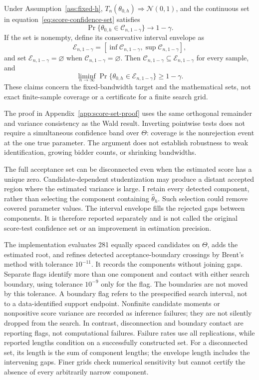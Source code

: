 \begin{proposition}
\label{prop:score-set-coverage}
Under Assumption~\ref{ass:fixed-h},
$T_n(\theta_{0,h})\Rightarrow\mathcal N(0,1)$, and the continuous set in
equation~\eqref{eq:score-confidence-set} satisfies
\[
\Pr\{\theta_{0,h}\in\mathcal C_{n,1-\gamma}\}\longrightarrow1-\gamma.
\]
If the set is nonempty, define its conservative interval envelope as
\begin{equation}
\mathcal E_{n,1-\gamma}
=[\inf\mathcal C_{n,1-\gamma},\sup\mathcal C_{n,1-\gamma}],
\label{eq:score-envelope}
\end{equation}
and set $\mathcal E_{n,1-\gamma}=\varnothing$ when
$\mathcal C_{n,1-\gamma}=\varnothing$. Then
$\mathcal C_{n,1-\gamma}\subseteq\mathcal E_{n,1-\gamma}$ for every sample,
and
\[
\liminf_{n\to\infty}
\Pr\{\theta_{0,h}\in\mathcal E_{n,1-\gamma}\}\geq1-\gamma.
\]
These claims concern the fixed-bandwidth target and the mathematical sets,
not exact finite-sample coverage or a certificate for a finite search grid.
\end{proposition}

The proof in Appendix~\ref{app:score-set-proof} uses the same orthogonal
remainder and variance consistency as the Wald result. Inverting pointwise
tests does not require a simultaneous confidence band over $\Theta$: coverage
is the nonrejection event at the one true parameter. The argument does not
establish robustness to weak identification, growing bidder counts, or
shrinking bandwidths.

The full acceptance set can be disconnected even when the estimated score
has a unique zero. Candidate-dependent studentization may produce a distant
accepted region where the estimated variance is large. I retain every
detected component, rather than selecting the component containing
$\widehat\theta_h$. Such selection could remove covered parameter values.
The interval envelope fills the rejected gaps between components. It is
therefore reported separately and is not called the original score-test
confidence set or an improvement in estimation precision.

The implementation evaluates 281 equally spaced candidates on $\Theta$,
adds the estimated root, and refines detected acceptance-boundary crossings
by Brent's method with tolerance $10^{-11}$. It records the components without
joining gaps. Separate flags identify more than one component and contact
with either search boundary, using tolerance $10^{-9}$ only for the flag.
The boundaries are not moved by this tolerance. A boundary flag refers to the
prespecified search interval, not to a data-identified support endpoint.
Nonfinite candidate moments or nonpositive score variance are recorded as
inference failures; they are not silently dropped from the search. In
contrast, disconnection and boundary contact are reporting flags, not
computational failures. Failure rates use all replications, while reported
lengths condition on a successfully constructed set. For a disconnected set,
its length is the sum of component lengths; the envelope length includes the
intervening gaps. Finer grids check numerical sensitivity but cannot certify
the absence of every arbitrarily narrow component.

